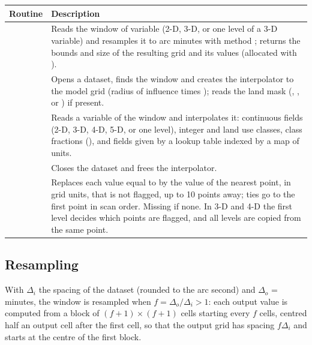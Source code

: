 \begin{longtable}{L{6cm} L{8cm}}
  \toprule
  \textbf{Routine} & \textbf{Description} \\
  \midrule
  \endhead
  \bottomrule
  \endfoot
   &
    Reads the window of variable  (2-D, 3-D, or one level of a
    3-D variable) and resamples it to  arc minutes with method
    ; returns the bounds and size of the resulting grid and its
    values (allocated with ). \\
   &
    Opens a dataset, finds the window and creates the interpolator to the
    model grid (radius of influence  times ); reads the
    land mask (, ,  or
    ) if present. \\
   &
    Reads a variable of the window and interpolates it: continuous fields
    (2-D, 3-D, 4-D, 5-D, or one level), integer and land use classes,
    class fractions (), and fields given by a
    lookup table indexed by a map of units. \\
   & Closes the dataset and frees the interpolator. \\
   &
    Replaces each value equal to  by the value of the nearest
    point, in grid units, that is not flagged, up to 10 points away; ties go
    to the first point in scan order. Missing if none. In 3-D and 4-D the
    first level decides which points are flagged, and all levels are
    copied from the same point. \\
\end{longtable}

\subsection{Resampling}

With $\Delta_i$ the spacing of the dataset (rounded to the arc second) and
$\Delta_o$ =  minutes, the window is resampled when
$f = \Delta_o/\Delta_i > 1$: each output value is computed from a block of
$(f+1)\times(f+1)$ cells starting every $f$ cells, centred half an output
cell after the first cell, so that the output grid has spacing $f\Delta_i$
and starts at the centre of the first block.

